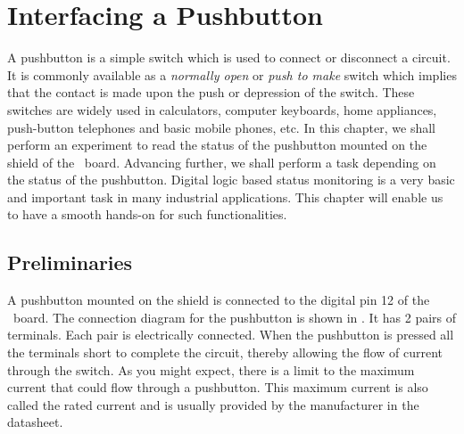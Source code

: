 \chapter{Interfacing a Pushbutton}
\thispagestyle{empty}
\label{pushbutton}

\newcommand{\LocPushfig}{\Origin/user-code/push/figures}
\newcommand{\LocPushscicode}{\Origin/user-code/push/scilab}
\newcommand{\LocPushscibrief}[1]{{\tt
    \seqsplit{Origin/user-code/push/scilab/#1}}, 
see \fnrefp{fn:file-loc}}
\newcommand{\LocPushardcode}{\Origin/user-code/push/arduino}
\newcommand{\LocPushardbrief}[1]{{\tt
    \seqsplit{Origin/user-code/push/arduino/#1}}, 
see \fnrefp{fn:file-loc}}


\newcommand{\LocPushpycode}{\Origin/user-code/push/python}
\newcommand{\LocPushpybrief}[1]{{\tt
    \seqsplit{Origin/user-code/push/python/#1}}, 
see \fnrefp{fn:file-loc}}

\newcommand{\LocPushjuliacode}{\Origin/user-code/push/julia}
\newcommand{\LocPushjuliabrief}[1]{{\tt
    \seqsplit{Origin/user-code/push/julia/#1}}, 
see \fnrefp{fn:file-loc}}


\newcommand{\LocPushOpenModelicacode}{\Origin/user-code/push/OpenModelica}  %
\newcommand{\LocPushOpenModelicabrief}[1]{{\tt \seqsplit{%
    Origin/user-code/led/OpenModelica/#1}}, see \fnrefp{fn:file-loc}} %

A pushbutton is a simple switch which is used to connect or disconnect
a circuit. It is commonly available as a \emph{normally open} or
\emph{push to make} switch which implies that the contact is made upon
the push or depression of the switch. These switches are widely used
in calculators, computer keyboards, home appliances, push-button
telephones and basic mobile phones, etc. In this chapter, we shall
perform an experiment to read the status of the pushbutton mounted
on the shield of the \arduino\ board. Advancing further, we shall
perform a task depending on the status of the pushbutton. Digital
logic based status monitoring is a very basic and important task in
many industrial applications. This chapter will enable us to have a
smooth hands-on for such functionalities. 

\section{Preliminaries}
A pushbutton mounted on the shield is connected to the digital pin 12
of the \arduino\ board. The connection diagram for the pushbutton is
shown in . It has 2 pairs of
terminals. Each pair is electrically connected. When the pushbutton is
pressed all the terminals short to complete the circuit, thereby
allowing the flow of current through the switch. As you might expect,
there is a limit to the maximum current that could flow through a
pushbutton. This maximum current is also called the rated current and
is usually provided by the manufacturer in the datasheet.  

